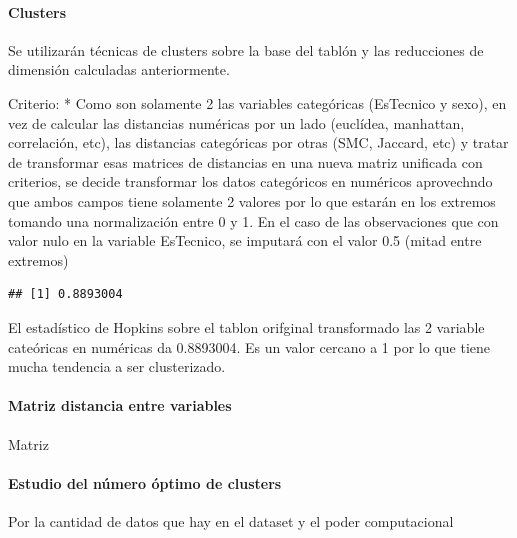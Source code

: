 \documentclass[]{article}
\let\oldparagraph\paragraph
\renewcommand{\paragraph}[1]{\oldparagraph{#1}\mbox{}}
\begin{document}
\hypertarget{clusters}{%
\paragraph{Clusters}\label{clusters}}

Se utilizarán técnicas de clusters sobre la base del tablón y las
reducciones de dimensión calculadas anteriormente.

Criterio: * Como son solamente 2 las variables categóricas (EsTecnico y
sexo), en vez de calcular las distancias numéricas por un lado
(euclídea, manhattan, correlación, etc), las distancias categóricas por
otras (SMC, Jaccard, etc) y tratar de transformar esas matrices de
distancias en una nueva matriz unificada con criterios, se decide
transformar los datos categóricos en numéricos aprovechndo que ambos
campos tiene solamente 2 valores por lo que estarán en los extremos
tomando una normalización entre 0 y 1. En el caso de las observaciones
que con valor nulo en la variable EsTecnico, se imputará con el valor
0.5 (mitad entre extremos)

\begin{lstlisting}
## [1] 0.8893004
\end{lstlisting}

El estadístico de Hopkins sobre el tablon orifginal transformado las 2
variable cateóricas en numéricas da 0.8893004. Es un valor cercano a 1
por lo que tiene mucha tendencia a ser clusterizado.

\hypertarget{matriz-distancia-entre-variables}{%
\paragraph{Matriz distancia entre
variables}\label{matriz-distancia-entre-variables}}

Matriz

\hypertarget{estudio-del-nuxfamero-uxf3ptimo-de-clusters}{%
\paragraph{Estudio del número óptimo de
clusters}\label{estudio-del-nuxfamero-uxf3ptimo-de-clusters}}

Por la cantidad de datos que hay en el dataset y el poder computacional
\end{document}
